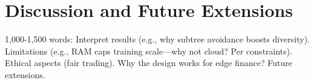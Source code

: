 \section{Discussion and Future Extensions}
\label{sec:discuss}

1,000-1,500 words: Interpret results (e.g., why subtree avoidance boosts diversity). Limitations (e.g., RAM caps training scale—why not cloud? Per constraints). Ethical aspects (fair trading). Why the design works for edge finance? Future extensions.